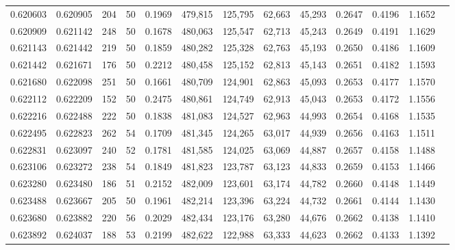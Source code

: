 \begin{tabular}{rrrrrrrrrrrrr}
0.620603 & 0.620905 &   204 &  50 &                                     0.1969 & 479,815 & 125,795 &  62,663 &  45,293 & 0.2647 & 0.4196 & 1.1652 \\
0.620909 & 0.621142 &   248 &  50 &                                     0.1678 & 480,063 & 125,547 &  62,713 &  45,243 & 0.2649 & 0.4191 & 1.1629 \\
0.621143 & 0.621442 &   219 &  50 &                                     0.1859 & 480,282 & 125,328 &  62,763 &  45,193 & 0.2650 & 0.4186 & 1.1609 \\
0.621442 & 0.621671 &   176 &  50 &                                     0.2212 & 480,458 & 125,152 &  62,813 &  45,143 & 0.2651 & 0.4182 & 1.1593 \\
0.621680 & 0.622098 &   251 &  50 &                                     0.1661 & 480,709 & 124,901 &  62,863 &  45,093 & 0.2653 & 0.4177 & 1.1570 \\
0.622112 & 0.622209 &   152 &  50 &                                     0.2475 & 480,861 & 124,749 &  62,913 &  45,043 & 0.2653 & 0.4172 & 1.1556 \\
0.622216 & 0.622488 &   222 &  50 &                                     0.1838 & 481,083 & 124,527 &  62,963 &  44,993 & 0.2654 & 0.4168 & 1.1535 \\
0.622495 & 0.622823 &   262 &  54 &                                     0.1709 & 481,345 & 124,265 &  63,017 &  44,939 & 0.2656 & 0.4163 & 1.1511 \\
0.622831 & 0.623097 &   240 &  52 &                                     0.1781 & 481,585 & 124,025 &  63,069 &  44,887 & 0.2657 & 0.4158 & 1.1488 \\
0.623106 & 0.623272 &   238 &  54 &                                     0.1849 & 481,823 & 123,787 &  63,123 &  44,833 & 0.2659 & 0.4153 & 1.1466 \\
0.623280 & 0.623480 &   186 &  51 &                                     0.2152 & 482,009 & 123,601 &  63,174 &  44,782 & 0.2660 & 0.4148 & 1.1449 \\
0.623488 & 0.623667 &   205 &  50 &                                     0.1961 & 482,214 & 123,396 &  63,224 &  44,732 & 0.2661 & 0.4144 & 1.1430 \\
0.623680 & 0.623882 &   220 &  56 &                                     0.2029 & 482,434 & 123,176 &  63,280 &  44,676 & 0.2662 & 0.4138 & 1.1410 \\
0.623892 & 0.624037 &   188 &  53 &                                     0.2199 & 482,622 & 122,988 &  63,333 &  44,623 & 0.2662 & 0.4133 & 1.1392 \\

\end{tabular}
